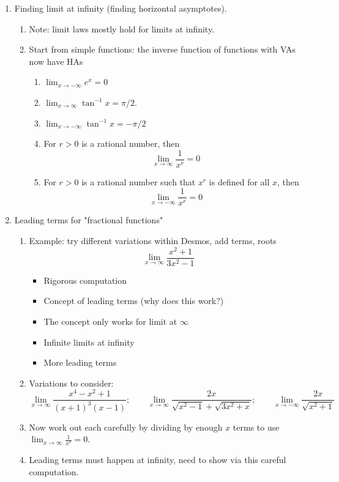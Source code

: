 \documentclass{article}
\begin{document}
\begin{enumerate}
\item Finding limit at infinity (finding horizontal asymptotes).
\begin{enumerate}
\item Note: limit laws mostly hold for limits at infinity.
\item Start from simple functions: the inverse function of functions with VAs now have HAs
\begin{enumerate}
\item $\lim_{x\rightarrow -\infty}e^x = 0$
\item $\lim_{x\rightarrow \infty} \tan^{-1}x=\pi/2$. 
\item $\lim_{x\rightarrow -\infty} \tan^{-1}x= - \pi/2$  
\item For $r>0$ is a rational number, then 
$$\lim_{x\rightarrow \infty} \frac{1}{x^r}= 0 $$
\item For $r>0$ is a rational number such that $x^r$ is defined for all $x$, then 
$$\lim_{x\rightarrow -\infty} \frac{1}{x^r}= 0 $$
\end{enumerate}
\end{enumerate}

\item Leading terms for "fractional functions"
\begin{enumerate}
\item Example: try different variations within Desmos, add terms, roots
$$
\lim_{x\rightarrow \infty} \frac{x^2+1}{3x^2-1}
$$
\begin{itemize}
\item Rigorous computation
\item Concept of leading terms (why does this work?)
\item The concept only works for limit at $\infty$
\item Infinite limits at infinity
\item More leading terms
\end{itemize}
\item Variations to consider:
$$
\lim_{x\rightarrow \infty} \frac{x^4-x^2+1}{(x+1)^3(x-1)};
\quad\quad
\lim_{x\rightarrow \infty} \frac{2x}{\sqrt{x^2-1}+\sqrt{3x^2+x}};
\quad\quad
\lim_{x\rightarrow -\infty} \frac{2x}{\sqrt{x^2+1}}
$$
\item Now work out each carefully by dividing by enough $x$ terms to use $\lim_{x\rightarrow\infty}\frac{1}{x^r}=0$.
\item Leading terms must happen at infinity, need to show via this careful computation.
\end{enumerate}


\end{enumerate}
\end{document}

